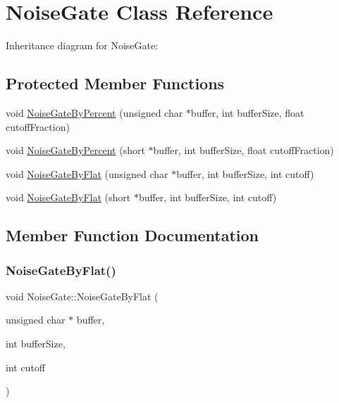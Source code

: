\hypertarget{classNoiseGate}{}\section{Noise\+Gate Class Reference}
\label{classNoiseGate}


Inheritance diagram for Noise\+Gate\+:
\subsection*{Protected Member Functions}
\begin{DoxyCompactItemize}
\item 
void \hyperlink{classNoiseGate_a9129f03e1f6ee5ea3f893e5ad554e036}{Noise\+Gate\+By\+Percent} (unsigned char $\ast$buffer, int buffer\+Size, float cutoff\+Fraction)
\item 
void \hyperlink{classNoiseGate_a8ca4b8f8894725e85023bb791251b2c1}{Noise\+Gate\+By\+Percent} (short $\ast$buffer, int buffer\+Size, float cutoff\+Fraction)
\item 
void \hyperlink{classNoiseGate_a19bc105849e1d1c374e5fd1d0c2b716b}{Noise\+Gate\+By\+Flat} (unsigned char $\ast$buffer, int buffer\+Size, int cutoff)
\item 
void \hyperlink{classNoiseGate_a0d33dba5ca22b83898d3c7b8148ef439}{Noise\+Gate\+By\+Flat} (short $\ast$buffer, int buffer\+Size, int cutoff)
\end{DoxyCompactItemize}


\subsection{Member Function Documentation}
\mbox{\label{classNoiseGate_a19bc105849e1d1c374e5fd1d0c2b716b}} 
\subsubsection{\texorpdfstring{Noise\+Gate\+By\+Flat()}{NoiseGateByFlat()}\hspace{0.1cm}{\footnotesize\ttfamily [1/2]}}
{\footnotesize\ttfamily void Noise\+Gate\+::\+Noise\+Gate\+By\+Flat (\begin{DoxyParamCaption}\item[{unsigned char $\ast$}]{buffer,  }\item[{int}]{buffer\+Size,  }\item[{int}]{cutoff }\end{DoxyParamCaption})\hspace{0.3cm}{\ttfamily [protected]}}

